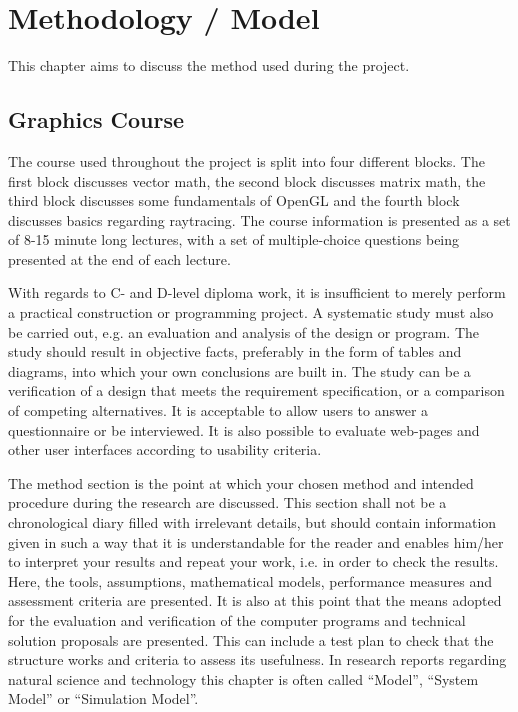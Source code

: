 \section{Methodology / Model}
\label{ch:method}
\noindent	
This chapter aims to discuss the method used during the project.

\subsection{Graphics Course}

The course used throughout the project is split into four different blocks. The first block discusses vector math, the second block discusses matrix math, the third block discusses some fundamentals of OpenGL and the fourth block discusses basics regarding raytracing\cite{edx}. The course information is presented as a set of 8-15 minute long lectures, with a set of multiple-choice questions being presented at the end of each lecture.

\iffalse
With regards to C- and D-level diploma work, it is insufficient to merely perform a practical construction or programming project. A systematic study must also be carried out, e.g. an evaluation and analysis of the design or program. The study should result in objective facts, preferably in the form of tables and diagrams, into which your own conclusions are built in. The study can be a verification of a design that meets the requirement specification, or a comparison of competing alternatives. It is acceptable to allow users to answer a questionnaire or be interviewed. It is also possible to evaluate web-pages and other user interfaces according to usability criteria.

The method section is the point at which your chosen method and intended procedure during the research are discussed. This section shall not be a chronological diary filled with irrelevant details, but should contain information given in such a way that it is understandable for the reader and enables him/her to interpret your results and repeat your work, i.e. in order to check the results. Here, the tools, assumptions, mathematical models, performance measures and assessment criteria are presented. It is also at this point that the means adopted for the evaluation and verification of the computer programs and technical solution proposals are presented. This can include a test plan to check that the structure works and criteria to assess its usefulness. In research reports regarding natural science and technology this chapter is often called “Model”, “System Model” or “Simulation Model”.

